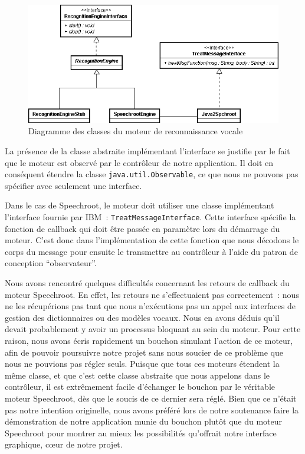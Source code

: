 \begin{figure}[ht!]
 \centering
 \includegraphics[scale=.5,keepaspectratio=true]{./images/EngineDiagram.png}
 \caption{Diagramme des classes du moteur de reconnaissance vocale}
 \label{fig:engineDiagram}
\end{figure}

La présence de la classe abstraite implémentant l'interface se justifie par le fait que le moteur est observé par le contrôleur de notre application.
Il doit en conséquent étendre la classe \texttt{java.util.Observable}, ce que nous ne pouvons pas spécifier avec seulement une interface.

Dans le cas de Speechroot, le moteur doit utiliser une classe implémentant l'interface fournie par IBM~: \texttt{TreatMessageInterface}.
Cette interface spécifie la fonction de callback qui doit être passée en paramètre lors du démarrage du moteur.
C'est donc dans l'implémentation de cette fonction que nous décodons le corps du message pour ensuite le transmettre au contrôleur à l'aide du patron de conception ``observateur''.

Nous avons rencontré quelques difficultés concernant les retours de callback du moteur Speechroot.
En effet, les retours ne s'effectuaient pas correctement~: nous ne les récupérions pas tant que nous n'exécutions pas un appel aux interfaces de gestion des dictionnaires ou des modèles vocaux.
Nous en avons déduis qu'il devait probablement y avoir un processus bloquant au sein du moteur.
Pour cette raison, nous avons écris rapidement un bouchon simulant l'action de ce moteur, afin de pouvoir poursuivre notre projet sans nous soucier de ce problème que nous ne pouvions pas régler seuls.
Puisque que tous ces moteurs étendent la même classe, et que c'est cette classe abstraite que nous appelons dans le contrôleur, il est extrêmement facile d'échanger le bouchon par le véritable moteur Speechroot, dès que le soucis de ce dernier sera réglé.
Bien que ce n'était pas notre intention originelle, nous avons préféré lors de notre soutenance faire la démonstration de notre application munie du bouchon plutôt que du moteur Speechroot pour montrer au mieux les possibilités qu'offrait notre interface graphique, cœur de notre projet.



